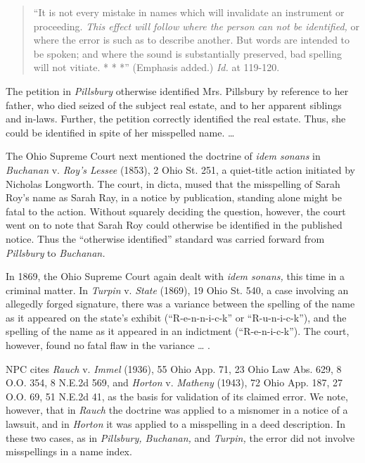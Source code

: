 \begin{quote}
 {}``It is not every mistake in names which will invalidate an instrument or
proceeding. \textit{This effect will follow where the person can not be
identified,} or where the error is such as to describe another. But words are
intended to be spoken; and where the sound is substantially preserved, bad
spelling will not vitiate. * * *'' (Emphasis added.) \textit{Id.} at 119-120.
\end{quote}

The petition in \textit{Pillsbury} otherwise identified Mrs. Pillsbury by
reference to her father, who died seized of the subject real estate, and to her
apparent siblings and in-laws. Further, the petition correctly identified the
real estate. Thus, she could be identified in spite of her misspelled name.
\dots{}

The Ohio Supreme Court next mentioned the doctrine of \textit{idem sonans} in
\textit{Buchanan} v. \textit{Roy's Lessee} (1853), 2 Ohio St. 251, a
quiet-title action initiated by Nicholas Longworth. The court, in dicta, mused
that the misspelling of Sarah Roy's name as Sarah Ray, in a notice by
publication, standing alone might be fatal to the action. Without squarely
deciding the question, however, the court went on to note that Sarah Roy could
otherwise be identified in the published notice. Thus the ``otherwise
identified'' standard was carried forward from \textit{Pillsbury} to
\textit{Buchanan.}

In 1869, the Ohio Supreme Court again dealt with \textit{idem sonans,} this time
in a criminal matter. In \textit{Turpin} v. \textit{State} (1869), 19 Ohio St.
540, a case involving an allegedly forged signature, there was a variance
between the spelling of the name as it appeared on the state's exhibit
(``R-e-n-n-i-c-k'' or ``R-u-n-i-c-k''), and the spelling of the name as it
appeared in an indictment (``R-e-n-i-c-k''). The court, however, found no fatal
flaw in the variance \dots{} .

NPC cites \textit{Rauch} v. \textit{Immel} (1936), 55 Ohio App. 71, 23 Ohio Law
Abs. 629, 8 O.O. 354, 8 N.E.2d 569, and \textit{Horton} v. \textit{Matheny}
(1943), 72 Ohio App. 187, 27 O.O. 69, 51 N.E.2d 41, as the basis for validation
of its claimed error. We note, however, that in \textit{Rauch} the doctrine was
applied to a misnomer in a notice of a lawsuit, and in \textit{Horton} it was
applied to a misspelling in a deed description. In these two cases, as in
\textit{Pillsbury, Buchanan,} and \textit{Turpin,} the error did not involve
misspellings in a name index.

